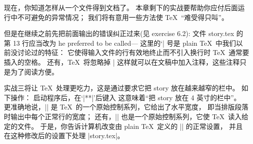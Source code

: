 现在，你知道怎样从一个文件得到文档了。%
本章剩下的实战要帮助你应付后面运行中不可避免的异常情况；
我们将有意用一些方法使 \TeX\ ``难受得只叫''。

但是在继续之前先把前面输出的错误纠正过来(见 exercise 6.2):
文件 story.tex 的第 13 行应当改为
\begintt
he preferred to be called---%
\endtt
这里的`|%
号是 plain \TeX\ 中我们以前没讨论过的特征：
它使得输入文件的行有效地终止而不引入换行时 \TeX\ 通常要插入的空格。%
还有，\TeX\ 将忽略掉 |%
这样就可以在文稿中加入注释，这些注释只是为了阅读方便。

实战三将让 \TeX\ 处理更吃力，这是通过要求它把 story 放在越来越窄的栏中。%
如下操作：
启动程序后，在`|**|'后键入
\begintt
\hsize=4in 
\endtt
\1这意味着``把 story 放在 4 英寸的栏中''。%
更准确地说，|\hsize| 是 \TeX\ 的一个原始控制系列，它给出了水平宽度，
即当排版段落时输出中每个正常行的宽度；
还有，|| 也是一个原始控制系列，它使 \TeX\ 读入给定的文件。%
于是，你告诉计算机改变由 plain \TeX\ 定义的 |\hsize| 的正常设置，
并且在这种修改后的设置下处理 |story.tex|。

